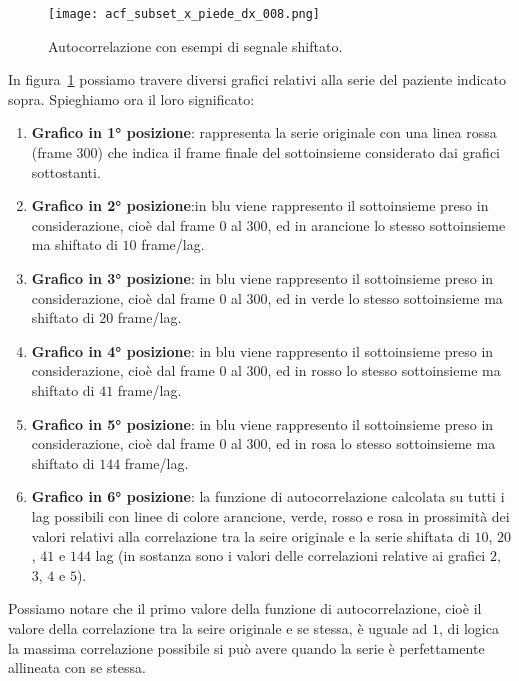 \begin{figure}[H]
    \centering
    \texttt{[image: acf\_subset\_x\_piede\_dx\_008.png]}
    \caption{Autocorrelazione con esempi di segnale shiftato.}
    \label{fig:acf_subset_x_piede_dx_008}
\end{figure}
In figura~\ref{fig:acf_subset_x_piede_dx_008} possiamo travere diversi grafici relativi alla
serie del paziente indicato sopra. Spieghiamo ora il loro significato:
\begin{enumerate}
    \item \textbf{Grafico in 1° posizione}: rappresenta la serie originale con una linea rossa (frame $300$)
    che indica il frame finale del sottoinsieme considerato dai grafici sottostanti.
    \item \textbf{Grafico in 2° posizione}:in blu viene rappresento il sottoinsieme preso in considerazione,
    cioè dal frame $0$ al $300$, ed in arancione lo stesso sottoinsieme ma shiftato di $10$ frame/lag.
    \item \textbf{Grafico in 3° posizione}: in blu viene rappresento il sottoinsieme preso in considerazione,
    cioè dal frame $0$ al $300$, ed in verde lo stesso sottoinsieme ma shiftato di $20$ frame/lag.
    \item \textbf{Grafico in 4° posizione}: in blu viene rappresento il sottoinsieme preso in considerazione,
    cioè dal frame $0$ al $300$, ed in rosso lo stesso sottoinsieme ma shiftato di $41$ frame/lag.
    \item \textbf{Grafico in 5° posizione}: in blu viene rappresento il sottoinsieme preso in considerazione,
    cioè dal frame $0$ al $300$, ed in rosa lo stesso sottoinsieme ma shiftato di $144$ frame/lag.
    \item \textbf{Grafico in 6° posizione}: la funzione di autocorrelazione calcolata su tutti i 
    lag possibili con linee di colore arancione, verde, rosso e rosa in prossimità dei valori 
    relativi alla correlazione tra la seire originale e la serie shiftata di $10$, $20$,
    $41$ e $144$ lag (in sostanza sono i valori delle correlazioni relative ai grafici $2$, $3$, $4$ e $5$).
\end{enumerate}

Possiamo notare che il primo valore della funzione di autocorrelazione, cioè il valore della correlazione
tra la seire originale e se stessa, è uguale ad $1$, di logica la massima correlazione possibile si può
avere quando la serie è perfettamente allineata con se stessa.


